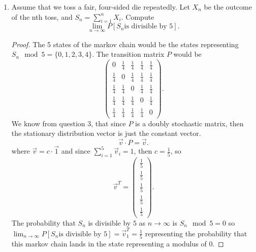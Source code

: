\documentclass[a4paper]{article}
\begin{document}
\begin{enumerate}
\begin{proof}
\end{proof}
\item Assume that we toss a fair, four-sided die repeatedly. Let $X_n$ be the outcome of the nth toss,
and $S_n = \sum^{n}_{i=1} X_i$. Compute
\[
  \lim_{n \to \infty} P[S_n \text{is divisible by 5}]
.\] 
\begin{proof}
  The 5 states of the markov chain would be the states representing $S_n \mod 5 = \{0,1,2,3,4\}$. The transition matrix $P$ would be 
   \[
     \begin{pmatrix} 0 & \frac{1}{4} & \frac{1}{4} & \frac{1}{4} & \frac{1}{4} \\ \frac{1}{4} & 0 & \frac{1}{4} & \frac{1}{4} & \frac{1}{4} \\ \frac{1}{4} & \frac{1}{4} & 0 & \frac{1}{4} & \frac{1}{4} \\ \frac{1}{4} & \frac{1}{4} & \frac{1}{4} & 0  & \frac{1}{4} \\ \frac{1}{4} & \frac{1}{4} & \frac{1}{4} & \frac{1}{4} & 0 \end{pmatrix}
  .\]
  We know from question 3, that since $P$ is a doubly stochastic matrix, then the stationary distribution vector is just the constant vector. 
   \[
     \vec{v} \cdot P = \vec{v}
  .\] 
  where $\vec{v} = c \cdot \vec{1}$ and  since $\sum_{i=1}^{5} \vec{v}_i = 1$, then $c = \frac{1}{5}$, so
   \[
     \vec{v}^{T} = \begin{pmatrix} \frac{1}{5} \\ \frac{1}{5}\\ \frac{1}{5} \\ \frac{1}{5} \\ \frac{1}{5}  \end{pmatrix}
  .\] 
  The probability that $S_n$ is divisible by $5$ as  $n \to \infty$ is  $S_n \mod 5 = 0$ so  $\lim_{n \to \infty} P[S_n \text{is divisible by } 5 ] = \vec{v}^{T}_{1} = \frac{1}{5}$ representing the probability that this markov chain lands in the state representing a modulus of $0$. 
\end{proof} 

\end{enumerate}
\end{document}
